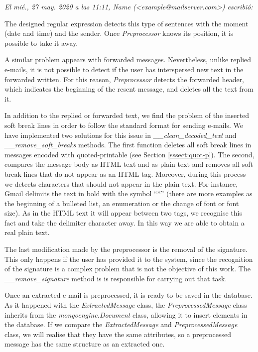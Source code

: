 \textit{El mié., 27 may. 2020 a las 11:11, Name (<example@mailserver.com>) escribió:}

The designed regular expression detects this type of sentences with the moment (date and time) and the sender. Once \textit{Preprocessor} knows its position, it is possible to take it away.

A similar problem appears with forwarded messages. Nevertheless, unlike replied e-mails, it is not possible to detect if the user has interspersed new text in the forwarded written. For this reason, \textit{Preprocessor} detects the forwarded header, which indicates the beginning of the resent message, and deletes all the text from it.

In addition to the replied or forwarded text, we find the problem of the inserted soft break lines in order to follow the standard format for sending e-mails. We have implemented two solutions for this issue in \textit{\_\_clean\_decoded\_text} and \textit{\_\_remove\_soft\_breaks} methods. The first function deletes all soft break lines in messages encoded with quoted-printable (see Section \ref{sssect:quot-p}). The second, compares the message body as HTML text and as plain text and removes all soft break lines that do not appear as an HTML tag. Moreover, during this process we detects characters that should not appear in the plain text. For instance, Gmail delimits the text in bold with the symbol ``*'' (there are more examples as the beginning of a bulleted list, an enumeration or the change of font or font size). As in the HTML text it will appear between two tags, we recognise this fact and take the delimiter character away. In this way we are able to obtain a real plain text.

The last modification made by the preprocessor is the removal of the signature. This only happens if the user has provided it to the system, since the recognition of the signature is a complex problem that is not the objective of this work. The \textit{\_\_remove\_signature} method is is responsible for carrying out that task.

Once an extracted e-mail is preprocessed, it is ready to be saved in the database. As it happened with the \textit{ExtractedMessage} class, the \textit{PreprocessedMessage} class inherits from the \textit{mongoengine.Document} class, allowing it to insert elements in the database. If we compare the \textit{ExtractedMessage} and \textit{PreprocessedMessage} class, we will realise that they have the same attributes, so a preprocessed message has the same structure as an extracted one.